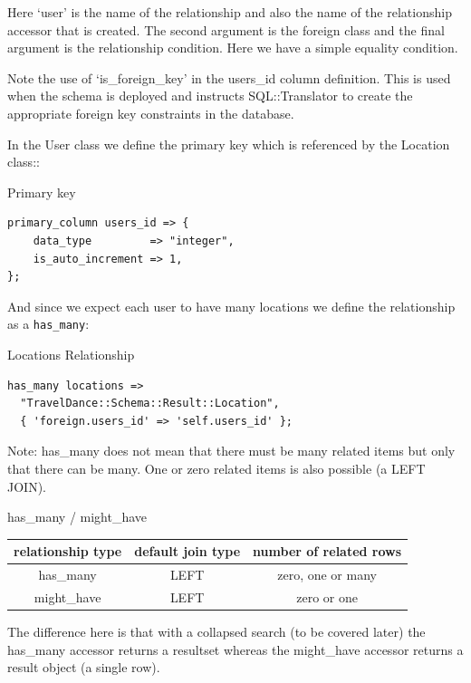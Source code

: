 Here ‘user’ is the name of the relationship and also the name of the relationship accessor that is created. The second argument is the foreign class and the final argument is the relationship condition. Here we have a simple equality condition.

Note the use of ‘is\_foreign\_key’ in the users\_id column definition. This is used when the schema is deployed and instructs SQL::Translator to create the appropriate foreign key constraints in the database.

In the User class we define the primary key which is referenced by the Location class::

\begin{frame}[fragile]{Primary key}
\begin{lstlisting}
primary_column users_id => {
    data_type         => "integer",
    is_auto_increment => 1,
};
\end{lstlisting}
\end{frame}

And since we expect each user to have many locations we define the relationship as a \verb|has_many|:

\begin{frame}[fragile]{Locations Relationship}
\begin{lstlisting}
has_many locations =>
  "TravelDance::Schema::Result::Location",
  { 'foreign.users_id' => 'self.users_id' };
\end{lstlisting}
\end{frame}

Note: has\_many does not mean that there must be many related items but only that there can be many. One or zero related items is also possible (a LEFT JOIN).


\begin{frame}{has\_many / might\_have}
\begin{table}
\begin{tabular}{c | c | c}
relationship type & default join type & number of related rows \\
\hline
has\_many & LEFT & zero, one or many \\
might\_have & LEFT & zero or one \\
\end{tabular}
\end{table}
\end{frame}

The difference here is that with a collapsed search (to be covered later)
the has\_many accessor returns a resultset whereas the might\_have accessor
returns a result object (a single row).

